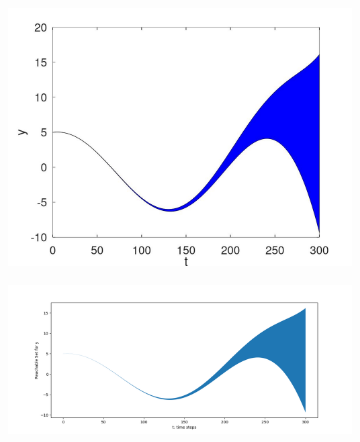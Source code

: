 \documentclass[EPiC]{easychair}
\begin{document}
\begin{figure}[h]
    \begin{subfigure}{0.47\textwidth}
    \centering
    \includegraphics[width=\textwidth]{SapoFigures/Rosslert/SapoRossler_Y.jpg}
    \end{subfigure}
    \begin{subfigure}{0.47\textwidth}
    \centering
    \includegraphics[width=1.3\textwidth,height=0.8\textwidth]{SapoFigures/Rosslert/KaaRosslerY.png}
    \end{subfigure}
  

\end{figure}
\end{document}
